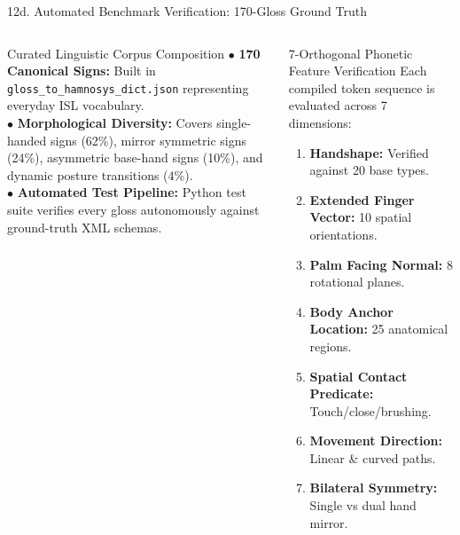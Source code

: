 \documentclass[aspectratio=169,xcolor={table,dvipsnames}]{beamer}
\begin{document}
\begin{frame}[t]{12d. Automated Benchmark Verification: 170-Gloss Ground Truth}
\vspace{2.0mm}
\begin{columns}[T]
    \begin{block}{Curated Linguistic Corpus Composition}
        \fontsize{6.8pt}{8.6pt}\selectfont
        $\bullet$ \textbf{170 Canonical Signs:} Built in \texttt{gloss\_to\_hamnosys\_dict.json} representing everyday ISL vocabulary.\\
        $\bullet$ \textbf{Morphological Diversity:} Covers single-handed signs (62\%), mirror symmetric signs (24\%), asymmetric base-hand signs (10\%), and dynamic posture transitions (4\%).\\
        $\bullet$ \textbf{Automated Test Pipeline:} Python test suite verifies every gloss autonomously against ground-truth XML schemas.
    \end{block}

    \begin{block}{7-Orthogonal Phonetic Feature Verification}
        \fontsize{6.8pt}{8.6pt}\selectfont
        Each compiled token sequence is evaluated across 7 dimensions:
        \begin{enumerate}\setlength{\itemsep}{0.04cm}
            \item \textbf{Handshape:} Verified against 20 base types.
            \item \textbf{Extended Finger Vector:} 10 spatial orientations.
            \item \textbf{Palm Facing Normal:} 8 rotational planes.
            \item \textbf{Body Anchor Location:} 25 anatomical regions.
            \item \textbf{Spatial Contact Predicate:} Touch/close/brushing.
            \item \textbf{Movement Direction:} Linear \& curved paths.
            \item \textbf{Bilateral Symmetry:} Single vs dual hand mirror.
        \end{enumerate}
    \end{block}
\end{columns}
\end{frame}
\end{document}
